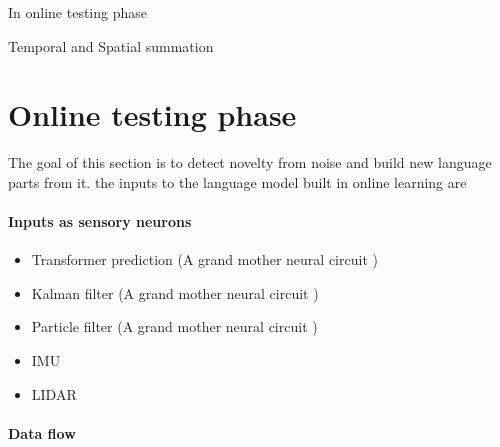 \documentclass[a4paper]{article}
\begin{document}
        In online testing phase
        
        Temporal and Spatial summation
    
    
    \section{Online testing phase}
        The goal of this section is to detect novelty from noise and build new language parts from it.
        the inputs to the language model built in online learning are
        
        \paragraph{Inputs as sensory neurons}
            \begin{itemize}
                \item Transformer prediction (A grand mother neural circuit )
                \item Kalman filter (A grand mother neural circuit )
                \item Particle filter (A grand mother neural circuit )
                \item IMU
                \item LIDAR
            \end{itemize}
        
        \paragraph{Data flow}
\end{document}
